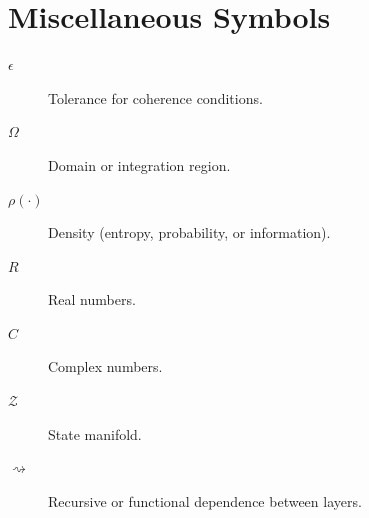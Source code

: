 \documentclass[12pt,oneside]{book}
\theoremstyle{plain}
\theoremstyle{definition}
\def\mathbb#1{#1}%
\begin{document}
\section{Miscellaneous Symbols}

\begin{description}

  \item[$\epsilon$] Tolerance for coherence conditions.

  \item[$\Omega$] Domain or integration region.

  \item[$\rho(\cdot)$] Density (entropy, probability, or information).

  \item[$\mathbb{R}$] Real numbers.

  \item[$\mathbb{C}$] Complex numbers.

  \item[$\mathcal{Z}$] State manifold.

  \item[$\rightsquigarrow$] Recursive or functional dependence between layers.

\end{description}
\end{document}
